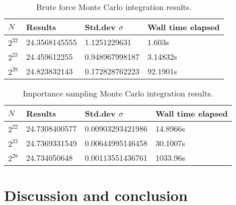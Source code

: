\documentclass[a4paper,11pt]{article}
\begin{document}
\begin{table}
    \centering
    \caption{Brute force Monte Carlo integration results.}
    \begin{tabular}{l l l l}
        \hline
        $N$         &   Results     & Std.dev $\sigma$  & Wall time elapsed  \\
        \hline
        $2^{22}$    & 24.3568145555 & 1.1251229631   & 1.603s \\
        $2^{23}$    & 24.459612255  & 0.948967998187 & 3.14832s \\
        $2^{28}$    & 24.823832143  & 0.172828762223 & 92.1901s \\
        \hline
    \end{tabular}
    \label{tab:res_bruteforceMC}
\end{table}
\begin{table}
    \centering
    \caption{Importance sampling Monte Carlo integration results.}
    \begin{tabular}{l l l l}
        \hline
        $N$         &   Results     & Std.dev $\sigma$ & Wall time elapsed  \\
        \hline
        $2^{22}$    & 24.7308400577 & 0.00903293421986 & 14.8966s \\
        $2^{23}$    & 24.7369331549 & 0.00644995146458 & 30.1007s \\
        $2^{28}$    & 24.734050648  & 0.00113551436761 & 1033.96s \\
        \hline
    \end{tabular}
    \label{tab:res_importanceMC}
\end{table}

\section{Discussion and conclusion}





\end{document}
